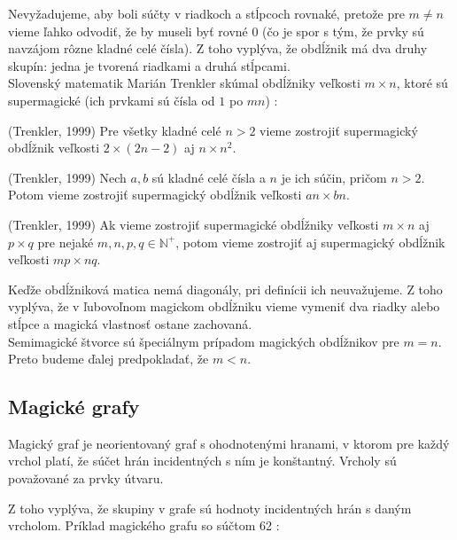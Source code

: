 Nevyžadujeme, aby boli súčty v riadkoch a stĺpcoch rovnaké, pretože pre $m \neq n$ vieme ľahko odvodiť, že by museli byť rovné $0$ (čo je spor s tým, že prvky sú navzájom rôzne kladné celé čísla). Z toho vyplýva, že obdĺžnik má dva druhy skupín: jedna je tvorená riadkami a druhá stĺpcami. \\

Slovenský matematik Marián Trenkler skúmal obdĺžniky veľkosti $m \times n$, ktoré sú supermagické (ich prvkami sú čísla od $1$ po $mn$) \cite{rectangles}:

\begin{theorem} (Trenkler, 1999) Pre všetky kladné celé $n > 2$ vieme zostrojiť supermagický obdĺžnik veľkosti $2 \times (2n - 2)$ aj $n \times n^2$.
\end{theorem}

\begin{theorem} (Trenkler, 1999) Nech $a,b$ sú kladné celé čísla a $n$ je ich súčin, pričom $n > 2$. Potom vieme zostrojiť supermagický obdĺžnik veľkosti $an \times bn$.
\end{theorem}

\begin{theorem} (Trenkler, 1999) Ak vieme zostrojiť supermagické obdĺžniky veľkosti $m \times n$ aj $p \times q$ pre nejaké $m,n,p,q \in \mathbb{N^+}$, potom vieme zostrojiť aj supermagický obdĺžnik veľkosti $mp \times nq$.
\end{theorem}

Keďže obdĺžniková matica nemá diagonály, pri definícii ich neuvažujeme. Z toho vyplýva, že v ľubovoľnom magickom obdĺžniku vieme vymeniť dva riadky alebo stĺpce a magická vlastnosť ostane zachovaná. \\

Semimagické štvorce sú špeciálnym prípadom magických obdĺžnikov pre $m = n$. Preto budeme ďalej predpokladať, že $m < n$.

\subsection{Magické grafy}
\begin{definition} Magický graf je neorientovaný graf s ohodnotenými hranami, v ktorom pre každý vrchol platí, že súčet hrán incidentných s ním je konštantný. Vrcholy sú považované za prvky útvaru.
\end{definition}

Z toho vyplýva, že skupiny v grafe sú hodnoty incidentných hrán s daným vrcholom. Príklad magického grafu so súčtom 62 \cite{antimagic}:

